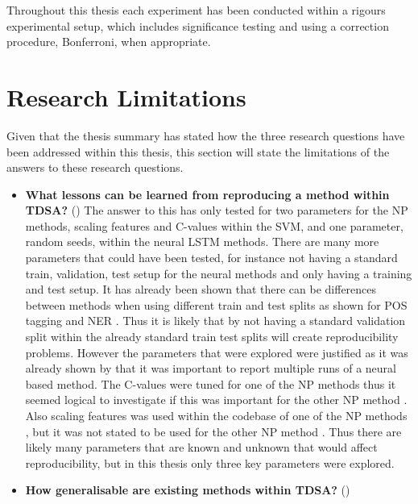 Throughout this thesis each experiment has been conducted within a rigours experimental setup, which includes significance testing and using a correction procedure, Bonferroni, when appropriate.

\section{Research Limitations}
Given that the thesis summary has stated how the three research questions have been addressed within this thesis, this section will state the limitations of the answers to these research questions. 

\begin{itemize}
    \item \textbf{What lessons can be learned from reproducing a method within TDSA?} ()\newline
    The answer to this has only tested for two parameters for the NP methods, scaling features and C-values within the SVM, and one parameter, random seeds, within the neural LSTM methods. There are many more parameters that could have been tested, for instance not having a standard train, validation, test setup for the neural methods and only having a training and test setup. It has already been shown that there can be differences between methods when using different train and test splits as shown for POS tagging \citep{gorman-bedrick-2019-need} and NER \citep{moss-etal-2019-fiesta}. Thus it is likely that by not having a standard validation split within the already standard train test splits will create reproducibility problems. However the parameters that were explored were justified as it was already shown by \citet{reimers-gurevych-2017-reporting} that it was important to report multiple runs of a neural based method. The C-values were tuned for one of the NP methods \citep{vo2015target} thus it seemed logical to investigate if this was important for the other NP method \citep{wang-etal-2017-tdparse}. Also scaling features was used within the codebase of one of the NP methods \citep{wang-etal-2017-tdparse}, but it was not stated to be used for the other NP method \citep{vo2015target}. Thus there are likely many parameters that are known and unknown that would affect reproducibility, but in this thesis only three key parameters were explored.  
    \item \textbf{How generalisable are existing methods within TDSA?} ()\newline

\end{itemize}
